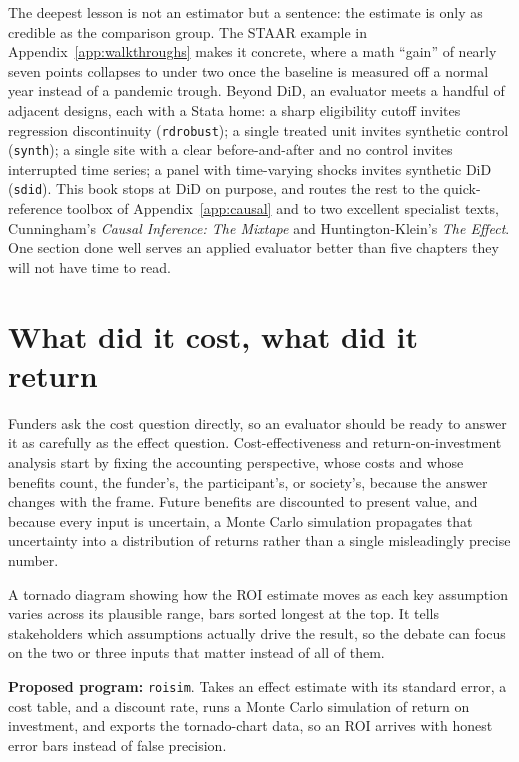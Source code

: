\documentclass[
    a4paper,
    fontsize=10pt,
    twoside=true,
    numbers=noenddot,
]{kaobook}
\newenvironment{vizcallout}[1][Visualization to build]{%
    \begin{vizbox}[frametitle={#1}]%
}{%
    \end{vizbox}%
}
\begin{document}
The deepest lesson is not an estimator but a sentence: the estimate is only as credible as the comparison group. The STAAR example in Appendix~\ref{app:walkthroughs} makes it concrete, where a math \enquote{gain} of nearly seven points collapses to under two once the baseline is measured off a normal year instead of a pandemic trough. Beyond DiD, an evaluator meets a handful of adjacent designs, each with a Stata home: a sharp eligibility cutoff invites regression discontinuity (\texttt{rdrobust}); a single treated unit invites synthetic control (\texttt{synth}); a single site with a clear before-and-after and no control invites interrupted time series; a panel with time-varying shocks invites synthetic DiD (\texttt{sdid}). This book stops at DiD on purpose, and routes the rest to the quick-reference toolbox of Appendix~\ref{app:causal} and to two excellent specialist texts, Cunningham's \emph{Causal Inference: The Mixtape} and Huntington-Klein's \emph{The Effect}. One section done well serves an applied evaluator better than five chapters they will not have time to read.

\section{What did it cost, what did it return}\label{sec:roi}
Funders ask the cost question directly, so an evaluator should be ready to answer it as carefully as the effect question. Cost-effectiveness and return-on-investment analysis start by fixing the accounting perspective, whose costs and whose benefits count, the funder's, the participant's, or society's, because the answer changes with the frame. Future benefits are discounted to present value, and because every input is uncertain, a Monte Carlo simulation propagates that uncertainty into a distribution of returns rather than a single misleadingly precise number.

\begin{vizcallout}[Visualization to build: the tornado chart]
A tornado diagram showing how the ROI estimate moves as each key assumption varies across its plausible range, bars sorted longest at the top. It tells stakeholders which assumptions actually drive the result, so the debate can focus on the two or three inputs that matter instead of all of them.
\end{vizcallout}

\begin{kaobox}[frametitle=Ado-file Idea: \texttt{roisim}]
\textbf{Proposed program:} \texttt{roisim}. Takes an effect estimate with its standard error, a cost table, and a discount rate, runs a Monte Carlo simulation of return on investment, and exports the tornado-chart data, so an ROI arrives with honest error bars instead of false precision.
\end{kaobox}
\end{document}
